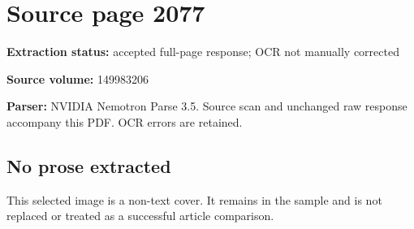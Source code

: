\clearpage
\section{Source page 2077}
\textbf{Extraction status:} accepted full-page response; OCR not manually corrected\par
\textbf{Source volume:} 149983206\par
\textbf{Parser:} NVIDIA Nemotron Parse 3.5. Source scan and unchanged raw response accompany this PDF. OCR errors are retained.\par\medskip
\subsection*{No prose extracted}
This selected image is a non-text cover. It remains in the sample and is not replaced or treated as a successful article comparison.

